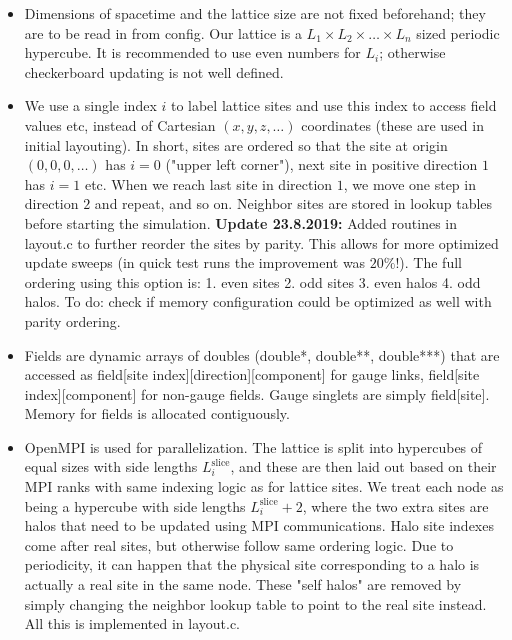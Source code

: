 \documentclass[11pt,a4paper]{article}
\begin{document}
\begin{itemize}
	
	\item Dimensions of spacetime and the lattice size are not fixed beforehand; they are to be read in from config. Our lattice is a $L_1 \times L_2 \times \dots \times L_n$ sized periodic hypercube. It is recommended to use even numbers for $L_i$; otherwise checkerboard updating is not well defined. 
	
	\item We use a single index $i$ to label lattice sites and use this index to access field values etc, instead of Cartesian $(x, y, z, \dots)$ coordinates (these are used in initial layouting). In short, sites are ordered so that the site at origin $(0, 0, 0, \dots)$ has $i = 0$ ("upper left corner"), next site in positive direction $1$ has $i = 1$ etc. When we reach last site in direction $1$, we move one step in direction $2$ and repeat, and so on. Neighbor sites are stored in lookup tables before starting the simulation. \textbf{Update 23.8.2019:} Added routines in layout.c to further reorder the sites by parity. This allows for more optimized update sweeps (in quick test runs the improvement was $20\%$!). The full ordering using this option is: 1. even sites 2. odd sites 3. even halos 4. odd halos. To do: check if memory configuration could be optimized as well with parity ordering.
	
	\item Fields are dynamic arrays of doubles (double*, double**, double***) that are accessed as field[site index][direction][component] for gauge links, field[site index][component] for non-gauge fields. Gauge singlets are simply field[site]. Memory for fields is allocated contiguously. 
	
	\item OpenMPI is used for parallelization. The lattice is split into hypercubes of equal sizes with side lengths $L^\text{slice}_i$, and these are then laid out based on their MPI ranks with same indexing logic as for lattice sites. We treat each node as being a hypercube with side lengths $L^\text{slice}_i + 2$, where the two extra sites are halos that need to be updated using MPI communications. Halo site indexes come after real sites, but otherwise follow same ordering logic. Due to periodicity, it can happen that the physical site corresponding to a halo is actually a real site in the same node. These "self halos" are removed by simply changing the neighbor lookup table to point to the real site instead. All this is implemented in layout.c. 
	

\end{itemize}
\end{document}

